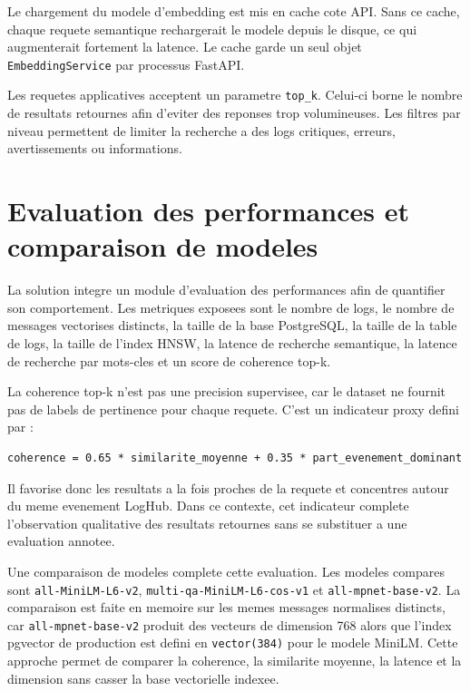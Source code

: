 \documentclass[12pt,a4paper]{article}
\begin{document}
Le chargement du modele d'embedding est mis en cache cote API. Sans ce cache, chaque requete
semantique rechargerait le modele depuis le disque, ce qui augmenterait fortement la latence. Le
cache garde un seul objet \texttt{EmbeddingService} par processus FastAPI.

Les requetes applicatives acceptent un parametre \texttt{top\_k}. Celui-ci borne le nombre de
resultats retournes afin d'eviter des reponses trop volumineuses. Les filtres par niveau permettent
de limiter la recherche a des logs critiques, erreurs, avertissements ou informations.

\section{Evaluation des performances et comparaison de modeles}

La solution integre un module d'evaluation des performances afin de quantifier son comportement. Les
metriques exposees sont le nombre de logs, le nombre de messages vectorises distincts, la taille de
la base PostgreSQL, la taille de la table de logs, la taille de l'index HNSW, la latence de recherche
semantique, la latence de recherche par mots-cles et un score de coherence top-k.

La coherence top-k n'est pas une precision supervisee, car le dataset ne fournit pas de labels de
pertinence pour chaque requete. C'est un indicateur proxy defini par :

\begin{lstlisting}
coherence = 0.65 * similarite_moyenne + 0.35 * part_evenement_dominant
\end{lstlisting}

Il favorise donc les resultats a la fois proches de la requete et concentres autour du meme
evenement LogHub. Dans ce contexte, cet indicateur complete l'observation qualitative des resultats
retournes sans se substituer a une evaluation annotee.

Une comparaison de modeles complete cette evaluation. Les modeles compares sont
\texttt{all-MiniLM-L6-v2}, \texttt{multi-qa-MiniLM-L6-cos-v1} et
\texttt{all-mpnet-base-v2}. La comparaison est faite en memoire sur les memes messages normalises
distincts, car \texttt{all-mpnet-base-v2} produit des vecteurs de dimension 768 alors que l'index
pgvector de production est defini en \texttt{vector(384)} pour le modele MiniLM. Cette approche
permet de comparer la coherence, la similarite moyenne, la latence et la dimension sans casser la
base vectorielle indexee.
\end{document}
